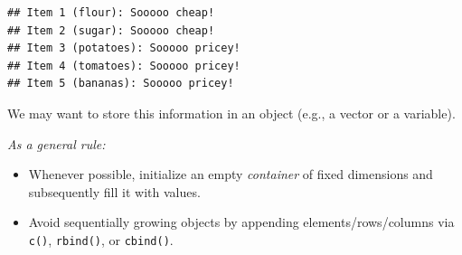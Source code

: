 \documentclass[
  11pt,
]{article}
\newenvironment{Shaded}{\begin{snugshade}}{\end{snugshade}}
\newcommand{\ConstantTok}[1]{\textcolor[rgb]{0.56,0.35,0.01}{#1}}
\newcommand{\ControlFlowTok}[1]{\textcolor[rgb]{0.13,0.29,0.53}{\textbf{#1}}}
\newcommand{\DocumentationTok}[1]{\textcolor[rgb]{0.56,0.35,0.01}{\textbf{\textit{#1}}}}
\newcommand{\FloatTok}[1]{\textcolor[rgb]{0.00,0.00,0.81}{#1}}
\newcommand{\FunctionTok}[1]{\textcolor[rgb]{0.13,0.29,0.53}{\textbf{#1}}}
\newcommand{\NormalTok}[1]{#1}
\newcommand{\OtherTok}[1]{\textcolor[rgb]{0.56,0.35,0.01}{#1}}
\newcommand{\SpecialCharTok}[1]{\textcolor[rgb]{0.81,0.36,0.00}{\textbf{#1}}}
\newcommand{\StringTok}[1]{\textcolor[rgb]{0.31,0.60,0.02}{#1}}
\providecommand{\tightlist}{%
  \setlength{\itemsep}{0pt}\setlength{\parskip}{0pt}}
\begin{document}
\begin{Shaded}
\end{Shaded}

\begin{verbatim}
## Item 1 (flour): Sooooo cheap!
## Item 2 (sugar): Sooooo cheap!
## Item 3 (potatoes): Sooooo pricey!
## Item 4 (tomatoes): Sooooo pricey!
## Item 5 (bananas): Sooooo pricey!
\end{verbatim}

We may want to store this information in an object (e.g., a vector or a variable).

\emph{As a general rule:}

\begin{itemize}
\tightlist
\item
  Whenever possible, initialize an empty \emph{container} of fixed dimensions and subsequently fill it with values.
\item
  Avoid sequentially growing objects by appending elements/rows/columns via \texttt{c()}, \texttt{rbind()}, or \texttt{cbind()}.
\end{itemize}

\begin{Shaded}
\end{Shaded}
\end{document}
